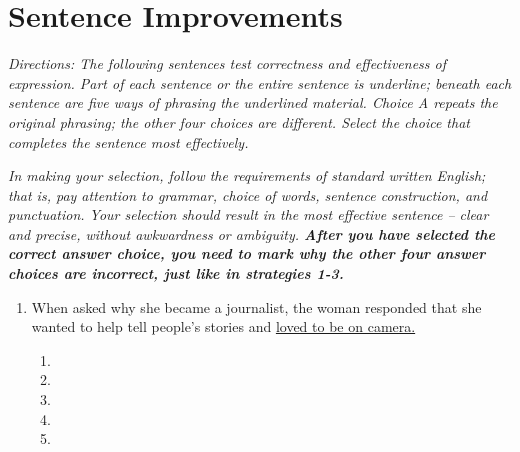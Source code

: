 \section{Sentence Improvements}

\textit{Directions: The following sentences test correctness and effectiveness of expression. Part of each sentence or the entire sentence is underline; beneath each sentence are five ways of phrasing the underlined material. Choice A repeats the original phrasing; the other four choices are different. Select the choice that completes the sentence most effectively.}

\bigskip
\textit{In making your selection, follow the requirements of standard written English; that is, pay attention to grammar, choice of words, sentence construction, and punctuation. Your selection should result in the most effective sentence -- clear and precise, without awkwardness or ambiguity. \textbf{After you have selected the correct answer choice, you need to mark why the other four answer choices are incorrect, just like in strategies 1-3.}}

\begin{enumerate}
\item When asked why she became a journalist, the woman responded that she wanted to help tell people’s stories and \ul{ loved to be on camera.}

\bigskip
\begin{enumerate}[label=(\Alph*)]
\item    \hrulefill
\item    \hrulefill
\item   \hrulefill
\item   \hrulefill
\item   \hrulefill
\end{enumerate}

\end{enumerate}

